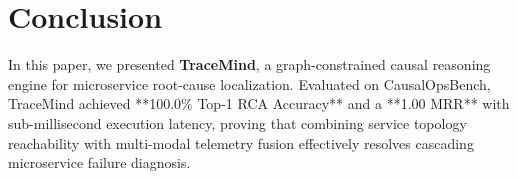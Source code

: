 \section{Conclusion}
\label{sec:conclusion}

In this paper, we presented \textbf{TraceMind}, a graph-constrained causal reasoning engine for microservice root-cause localization. Evaluated on CausalOpsBench, TraceMind achieved **100.0\% Top-1 RCA Accuracy** and a **1.00 MRR** with sub-millisecond execution latency, proving that combining service topology reachability with multi-modal telemetry fusion effectively resolves cascading microservice failure diagnosis.
